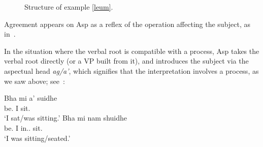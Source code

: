 \documentclass[output=paper]{langsci/langscibook}
\begin{document}
\begin{figure}
\caption{Structure of example \eqref{leum}.\label{tree1}}
\end{figure}

Agreement appears on Asp as a reflex of the  operation affecting the
subject, as in~.

In the situation where the verbal root is compatible with a process, Asp takes
the verbal root directly (or a VP built from it), and introduces the subject via the aspectual head
\emph{ag/a'}, which signifies that the interpretation involves a process, as we
saw above; see~:

\ea {}
\ea\gll Bha mi a' suidhe\\
be.\Pst{} I \Simp{} sit.\Vn{}\\
\glt \enquote*{I sat/was sitting.}\label{adger:56a}
\ex \gll Bha mi nam shuidhe\\
be.\Pst{} I in.\Poss.\Fsg{} sit.\Vn{}\\
\glt \enquote*{I was sitting/seated.}
\z
\z
\end{document}
